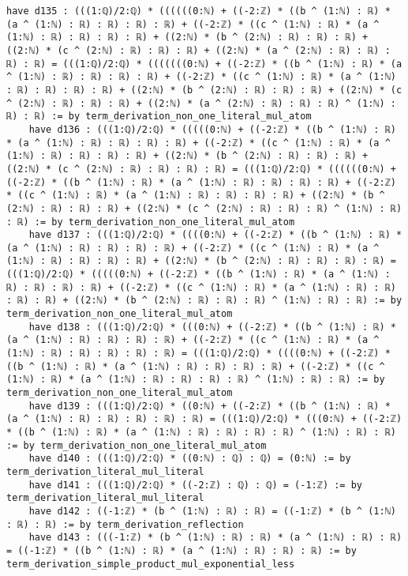 \documentclass{article}
\begin{document}
\begin{tcolorbox}[colback=white!10, width=\linewidth]
\begin{lstlisting}[language=Lean4]
    have d135 : (((1:ℚ)/2:ℚ) * ((((((0:ℕ) + ((-2:ℤ) * ((b ^ (1:ℕ) : ℝ) * (a ^ (1:ℕ) : ℝ) : ℝ) : ℝ) : ℝ) + ((-2:ℤ) * ((c ^ (1:ℕ) : ℝ) * (a ^ (1:ℕ) : ℝ) : ℝ) : ℝ) : ℝ) + ((2:ℕ) * (b ^ (2:ℕ) : ℝ) : ℝ) : ℝ) + ((2:ℕ) * (c ^ (2:ℕ) : ℝ) : ℝ) : ℝ) + ((2:ℕ) * (a ^ (2:ℕ) : ℝ) : ℝ) : ℝ) : ℝ) = (((1:ℚ)/2:ℚ) * (((((((0:ℕ) + ((-2:ℤ) * ((b ^ (1:ℕ) : ℝ) * (a ^ (1:ℕ) : ℝ) : ℝ) : ℝ) : ℝ) + ((-2:ℤ) * ((c ^ (1:ℕ) : ℝ) * (a ^ (1:ℕ) : ℝ) : ℝ) : ℝ) : ℝ) + ((2:ℕ) * (b ^ (2:ℕ) : ℝ) : ℝ) : ℝ) + ((2:ℕ) * (c ^ (2:ℕ) : ℝ) : ℝ) : ℝ) + ((2:ℕ) * (a ^ (2:ℕ) : ℝ) : ℝ) : ℝ) ^ (1:ℕ) : ℝ) : ℝ) := by term_derivation_non_one_literal_mul_atom
    have d136 : (((1:ℚ)/2:ℚ) * (((((0:ℕ) + ((-2:ℤ) * ((b ^ (1:ℕ) : ℝ) * (a ^ (1:ℕ) : ℝ) : ℝ) : ℝ) : ℝ) + ((-2:ℤ) * ((c ^ (1:ℕ) : ℝ) * (a ^ (1:ℕ) : ℝ) : ℝ) : ℝ) : ℝ) + ((2:ℕ) * (b ^ (2:ℕ) : ℝ) : ℝ) : ℝ) + ((2:ℕ) * (c ^ (2:ℕ) : ℝ) : ℝ) : ℝ) : ℝ) = (((1:ℚ)/2:ℚ) * ((((((0:ℕ) + ((-2:ℤ) * ((b ^ (1:ℕ) : ℝ) * (a ^ (1:ℕ) : ℝ) : ℝ) : ℝ) : ℝ) + ((-2:ℤ) * ((c ^ (1:ℕ) : ℝ) * (a ^ (1:ℕ) : ℝ) : ℝ) : ℝ) : ℝ) + ((2:ℕ) * (b ^ (2:ℕ) : ℝ) : ℝ) : ℝ) + ((2:ℕ) * (c ^ (2:ℕ) : ℝ) : ℝ) : ℝ) ^ (1:ℕ) : ℝ) : ℝ) := by term_derivation_non_one_literal_mul_atom
    have d137 : (((1:ℚ)/2:ℚ) * ((((0:ℕ) + ((-2:ℤ) * ((b ^ (1:ℕ) : ℝ) * (a ^ (1:ℕ) : ℝ) : ℝ) : ℝ) : ℝ) + ((-2:ℤ) * ((c ^ (1:ℕ) : ℝ) * (a ^ (1:ℕ) : ℝ) : ℝ) : ℝ) : ℝ) + ((2:ℕ) * (b ^ (2:ℕ) : ℝ) : ℝ) : ℝ) : ℝ) = (((1:ℚ)/2:ℚ) * (((((0:ℕ) + ((-2:ℤ) * ((b ^ (1:ℕ) : ℝ) * (a ^ (1:ℕ) : ℝ) : ℝ) : ℝ) : ℝ) + ((-2:ℤ) * ((c ^ (1:ℕ) : ℝ) * (a ^ (1:ℕ) : ℝ) : ℝ) : ℝ) : ℝ) + ((2:ℕ) * (b ^ (2:ℕ) : ℝ) : ℝ) : ℝ) ^ (1:ℕ) : ℝ) : ℝ) := by term_derivation_non_one_literal_mul_atom
    have d138 : (((1:ℚ)/2:ℚ) * (((0:ℕ) + ((-2:ℤ) * ((b ^ (1:ℕ) : ℝ) * (a ^ (1:ℕ) : ℝ) : ℝ) : ℝ) : ℝ) + ((-2:ℤ) * ((c ^ (1:ℕ) : ℝ) * (a ^ (1:ℕ) : ℝ) : ℝ) : ℝ) : ℝ) : ℝ) = (((1:ℚ)/2:ℚ) * ((((0:ℕ) + ((-2:ℤ) * ((b ^ (1:ℕ) : ℝ) * (a ^ (1:ℕ) : ℝ) : ℝ) : ℝ) : ℝ) + ((-2:ℤ) * ((c ^ (1:ℕ) : ℝ) * (a ^ (1:ℕ) : ℝ) : ℝ) : ℝ) : ℝ) ^ (1:ℕ) : ℝ) : ℝ) := by term_derivation_non_one_literal_mul_atom
    have d139 : (((1:ℚ)/2:ℚ) * ((0:ℕ) + ((-2:ℤ) * ((b ^ (1:ℕ) : ℝ) * (a ^ (1:ℕ) : ℝ) : ℝ) : ℝ) : ℝ) : ℝ) = (((1:ℚ)/2:ℚ) * (((0:ℕ) + ((-2:ℤ) * ((b ^ (1:ℕ) : ℝ) * (a ^ (1:ℕ) : ℝ) : ℝ) : ℝ) : ℝ) ^ (1:ℕ) : ℝ) : ℝ) := by term_derivation_non_one_literal_mul_atom
    have d140 : (((1:ℚ)/2:ℚ) * ((0:ℕ) : ℚ) : ℚ) = (0:ℕ) := by term_derivation_literal_mul_literal
    have d141 : (((1:ℚ)/2:ℚ) * ((-2:ℤ) : ℚ) : ℚ) = (-1:ℤ) := by term_derivation_literal_mul_literal
    have d142 : ((-1:ℤ) * (b ^ (1:ℕ) : ℝ) : ℝ) = ((-1:ℤ) * (b ^ (1:ℕ) : ℝ) : ℝ) := by term_derivation_reflection
    have d143 : (((-1:ℤ) * (b ^ (1:ℕ) : ℝ) : ℝ) * (a ^ (1:ℕ) : ℝ) : ℝ) = ((-1:ℤ) * ((b ^ (1:ℕ) : ℝ) * (a ^ (1:ℕ) : ℝ) : ℝ) : ℝ) := by term_derivation_simple_product_mul_exponential_less

\end{lstlisting}
\end{tcolorbox}
\end{document}
